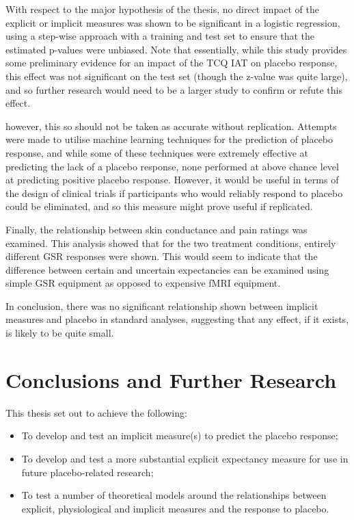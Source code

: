 With respect to the major hypothesis of the thesis, no direct impact
of the explicit or implicit measures was shown to be significant in a
logistic regression, using a step-wise approach with a training and
test set to ensure that the estimated p-values were unbiased. Note
that essentially, while this study provides some preliminary evidence
for an impact of the TCQ IAT on placebo response, this effect was not
significant on the test set (though the z-value was quite large), and
so further research would need to be a larger study to confirm or
refute this effect.

however, this %
so should not be taken as accurate without replication. Attempts were
made to utilise machine learning techniques for the prediction of
placebo response, and while some of these techniques were extremely
effective at predicting the lack of a placebo response, none performed
at above chance level at predicting positive placebo response.
However, it would be useful in terms of the design of clinical trials
if participants who would reliably respond to placebo could be
eliminated, and so this measure might prove useful if replicated.

Finally, the relationship between skin conductance and pain ratings
was examined. This analysis showed that for the two treatment
conditions, entirely different GSR responses were shown. This would
seem to indicate that the difference between certain and uncertain
expectancies can be examined using simple GSR equipment as opposed to
expensive fMRI equipment.

In conclusion, there was no significant relationship shown between
implicit measures and placebo in standard analyses, suggesting that
any effect, if it exists, is likely to be quite small.

\section{Conclusions and Further Research}

This thesis set out to achieve the following:

\begin{itemize}
\item To develop and test an implicit measure(s) to predict the
placebo response;
\item To develop and test a more substantial explicit expectancy
measure for use in future placebo-related research;
\item To test a number of theoretical models around the relationships
between explicit, physiological and implicit measures and the response
to placebo.
\end{itemize}

